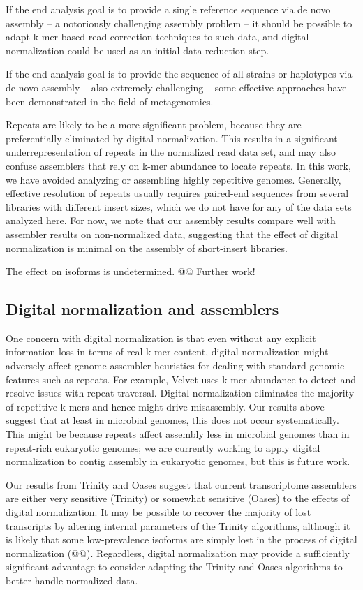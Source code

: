 \documentclass[10pt,draft]{article}
\begin{document}
If the end analysis goal is to provide a single reference sequence via
de novo assembly -- a notoriously challenging assembly problem -- it
should be possible to adapt k-mer based read-correction techniques to
such data, and digital normalization could be used as an initial data
reduction step.

If the end analysis goal is to provide the sequence of all strains or
haplotypes via de novo assembly -- also extremely challenging -- some
effective approaches have been demonstrated in the field of
metagenomics.

Repeats are likely to be a more significant problem, because they are
preferentially eliminated by digital normalization.  This results in a
significant underrepresentation of repeats in the normalized read data
set, and may also confuse assemblers that rely on k-mer abundance to
locate repeats.  In this work, we have avoided analyzing or assembling
highly repetitive genomes.  Generally, effective resolution of repeats
usually requires paired-end sequences from several libraries with
different insert sizes, which we do not have for any of the data sets
analyzed here.  For now, we note that our assembly results compare
well with assembler results on non-normalized data, suggesting that
the effect of digital normalization is minimal on the assembly of
short-insert libraries.

The effect on isoforms is undetermined.  @@  Further work!

\subsection*{Digital normalization and assemblers}

One concern with digital normalization is that even without any
explicit information loss in terms of real k-mer content, digital
normalization might adversely affect genome assembler heuristics for
dealing with standard genomic features such as repeats.  For example,
Velvet uses k-mer abundance to detect and resolve issues with repeat
traversal.  Digital normalization eliminates the majority of
repetitive k-mers and hence might drive misassembly. Our results above
suggest that at least in microbial genomes, this does not occur
systematically.  This might be because repeats affect assembly less in
microbial genomes than in repeat-rich eukaryotic genomes; we are
currently working to apply digital normalization to contig assembly in
eukaryotic genomes, but this is future work.

Our results from Trinity and Oases suggest that current transcriptome
assemblers are either very sensitive (Trinity) or somewhat sensitive
(Oases) to the effects of digital normalization.  It may be possible
to recover the majority of lost transcripts by altering internal
parameters of the Trinity algorithms, although it is likely that some
low-prevalence isoforms are simply lost in the process of digital
normalization (@@).  Regardless, digital normalization may provide
a sufficiently significant advantage to consider adapting the Trinity
and Oases algorithms to better handle normalized data.
\end{document}
